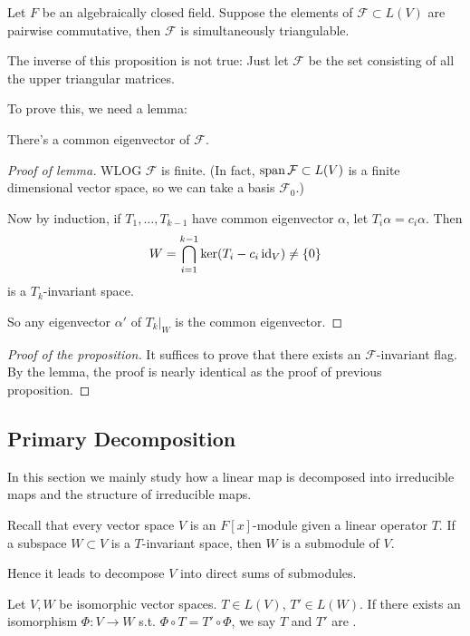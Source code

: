 \begin{proposition}
	Let $F$ be an algebraically closed field.
	Suppose the elements of $\mathcal{F}\subset L(V)$ are pairwise commutative,
	then $\mathcal{F}$ is simultaneously triangulable.
\end{proposition}
\begin{remark}
    The inverse of this proposition is not true:
	Just let $\mathcal{F}$ be the set consisting of all the
	upper triangular matrices.
\end{remark}
To prove this, we need a lemma:
\begin{lemma}
	There's a common eigenvector of $\mathcal{F}$.
\end{lemma}
\begin{proof}[Proof of lemma]
    WLOG $\mathcal{F}$ is finite.
	(In fact, $\operatorname{span} \mathcal{F} \subset L(V)$ is a finite dimensional vector space,
	so we can take a basis $\mathcal{F}_0$.)

	Now by induction, if $T_1,\dots, T_{k-1}$ have common eigenvector $\alpha$,
	let $T_i\alpha = c_i \alpha$.
	Then
	\[
	W = \bigcap_{i=1}^{k-1} \ker(T_i - c_i \operatorname{id}_V) \ne \{0\}
	\]
	is a $T_k$-invariant space.

	So any eigenvector $\alpha'$ of $T_k\big|_W$ is the common eigenvector.
\end{proof}
\begin{proof}[Proof of the proposition]
    It suffices to prove that there exists an $\mathcal{F}$-invariant flag.
	By the lemma, the proof is nearly identical as the proof
	of previous proposition.
\end{proof}

\subsection{Primary Decomposition}
\label{sub:Primary Decomposition}

In this section we mainly study how a linear map is decomposed into
irreducible maps and the structure of irreducible maps.

Recall that every vector space $V$ is an $F[x]$-module given a linear operator $T$.
If a subspace $W \subset V$ is a $T$-invariant space,
then $W$ is a submodule of $V$.

Hence it leads to decompose $V$ into direct sums of submodules.

\begin{definition}
	Let $V, W$ be isomorphic vector spaces.
	$T\in L(V)$, $T'\in L(W)$.
	If there exists an isomorphism $\Phi: V\to W$ s.t.
	$\Phi \circ T = T'\circ \Phi$,
	we say $T$ and $T'$ are .
\end{definition}

